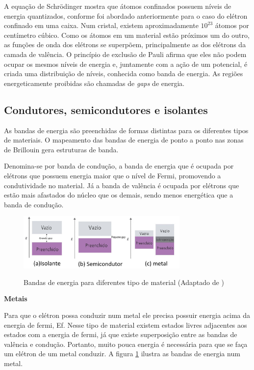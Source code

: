 \par A equação de Schrödinger mostra que átomos confinados possuem níveis de energia quantizados, conforme foi abordado anteriormente para o caso do elétron confinado em uma caixa. Num cristal, existem aproximadamente $10^{23}$ átomos por centímetro cúbico. Como os átomos em um material estão próximos um do outro, as funções de onda dos elétrons se superpõem, principalmente as dos elétrons da camada de valência. O princípio de exclusão de Pauli afirma que eles não podem ocupar os mesmos níveis de energia e, juntamente com a ação de um potencial, é criada uma distribuição de níveis, conhecida como banda de energia. As regiões energeticamente proibidas são chamadas de \textit{gaps} de energia\cite{qm_fis6}.

\subsection{Condutores, semicondutores e isolantes}

	\par As bandas de energia\cite{qm_fis6} são preenchidas de formas distintas para os diferentes tipos de materiais. O mapeamento das bandas de energia de ponto a ponto nas zonas de Brillouin gera estruturas de banda.

	\par Denomina-se por banda de condução, a banda de energia que é ocupada por elétrons que possuem energia maior que o nível de Fermi, promovendo a condutividade no material. Já a banda de valência é ocupada por elétrons que estão mais afastados do núcleo que os demais, sendo menos energética que a banda de condução.

	\begin{figure}[H]
      \caption{Bandas de energia para diferentes tipo de material (Adaptado de \cite{bulk1})}
      \centering
      \includegraphics[width=0.75\textwidth]{images/figura3.jpg}
      \label{fig3}
    \end{figure}

	\par \textbf{Metais}
	
		\par Para que o elétron possa conduzir num metal ele precisa possuir energia acima da energia de fermi, Ef. Nesse tipo de material existem estados livres adjacentes aos estados com a energia de fermi, já que existe superposição entre as bandas de valência e condução. Portanto, muito pouca energia é necessária para que se faça um elétron de um metal conduzir. A figura \ref{fig3} ilustra as bandas de energia num metal. 

